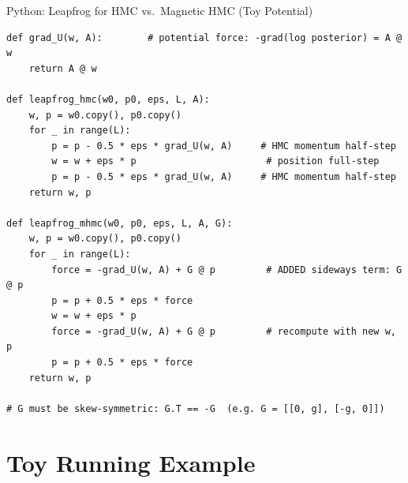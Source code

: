 \documentclass[aspectratio=169,10pt]{beamer}
\begin{document}
\begin{frame}[fragile]{Python: Leapfrog for HMC vs.\ Magnetic HMC (Toy Potential)}
\begin{lstlisting}
def grad_U(w, A):        # potential force: -grad(log posterior) = A @ w
    return A @ w

def leapfrog_hmc(w0, p0, eps, L, A):
    w, p = w0.copy(), p0.copy()
    for _ in range(L):
        p = p - 0.5 * eps * grad_U(w, A)     # HMC momentum half-step
        w = w + eps * p                       # position full-step
        p = p - 0.5 * eps * grad_U(w, A)     # HMC momentum half-step
    return w, p

def leapfrog_mhmc(w0, p0, eps, L, A, G):
    w, p = w0.copy(), p0.copy()
    for _ in range(L):
        force = -grad_U(w, A) + G @ p         # ADDED sideways term: G @ p
        p = p + 0.5 * eps * force
        w = w + eps * p
        force = -grad_U(w, A) + G @ p         # recompute with new w, p
        p = p + 0.5 * eps * force
    return w, p

# G must be skew-symmetric: G.T == -G  (e.g. G = [[0, g], [-g, 0]])
\end{lstlisting}
\end{frame}

\section{Toy Running Example}
\end{document}
